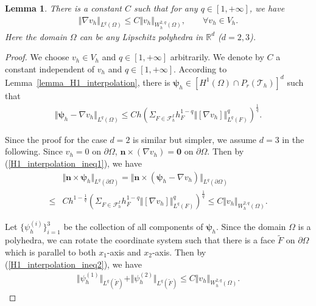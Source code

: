 \documentclass[12pt]{amsart}
\newtheorem{lemma}{Lemma}[section]
\theoremstyle{definition}
\theoremstyle{remark}
\begin{document}
\begin{lemma}
\label{lemma_discrete_norm_control}
There is a constant $C$ such that for any $q\in [1,+\infty]$, we have 
\begin{align*}
\Vert \nabla v_{h} \Vert_{L^{q}(\Omega)} \leq C \Vert v_{h}\Vert_{W_{h}^{2,q}(\Omega)}, 
\qquad \forall v_{h} \in V_{h}.
\end{align*}
Here the domain $\Omega$ can be any Lipschitz polyhedra in $\mathbb{R}^{d}$ ($d=2,3$).
\end{lemma}

\begin{proof}
We choose $v_{h}\in V_{h}$ and $q\in [1,+\infty]$ arbitrarily. We denote by $C$ a constant independent 
of $v_{h}$ and $q \in [1,+\infty]$. According to Lemma~\ref{lemma_H1_interpolation}, there is 
$\boldsymbol{\psi}_{h}\in [H^{1}(\Omega)\cap P_{r}(\mathcal{T}_{h})]^{d}$ such that 
\begin{align}
\label{H1_interpolation_ineq1}
\Vert \boldsymbol{\psi}_{h} - \nabla v_{h} \Vert_{L^{q}(\Omega)} 
\leq C h \left( \Sigma_{F \in \mathcal{F}_{h}^{I}} h_{F}^{1-q}\Vert [ \nabla v_{h}] 
\Vert_{L^{q}(F)}^{q} \right)^{\frac{1}{q}}.
\end{align}  

Since the proof for the case $d=2$ is similar but simpler, we assume $d=3$ in the following. 
Since $v_{h} = 0$ on $\partial\Omega$, $\boldsymbol{n}\times (\nabla v_{h}) = \boldsymbol{0}$ on $\partial\Omega$. 
Then by (\ref{H1_interpolation_ineq1}), we have 
\begin{align}
\label{H1_interpolation_ineq2}
& \Vert \boldsymbol{n} \times \boldsymbol{\psi}_{h} \Vert_{L^{q}(\partial\Omega)} 
= \Vert \boldsymbol{n} \times (\boldsymbol{\psi}_{h}-\nabla v_{h} )\Vert_{L^{q}(\partial\Omega)} \\
\nonumber
\leq & C h^{1-\frac{1}{q}}\left( \Sigma_{F \in \mathcal{F}_{h}^{I}} h_{F}^{1-q}\Vert [ \nabla v_{h}] 
\Vert_{L^{q}(F)}^{q} \right)^{\frac{1}{q}} \leq C \Vert v_{h}\Vert_{W_{h}^{2,q}(\Omega)}.
\end{align}

Let $\{ \psi_{h}^{(i)} \}_{i=1}^{3}$ be the collection of all components of $\boldsymbol{\psi}_{h}$.
Since the domain $\Omega$ is a polyhedra, we can rotate the coordinate system such that there is a face 
$\tilde{F}$ on $\partial\Omega$ which is parallel to both $x_{1}$-axis and $x_{2}$-axis. 
Then by (\ref{H1_interpolation_ineq2}), we have 
\begin{align}
\label{H1_interpolation_ineq3}
\Vert \psi_{h}^{(1)} \Vert_{L^{q}(\tilde{F})} + \Vert \psi_{h}^{(2)} \Vert_{L^{q}(\tilde{F})} 
\leq C \Vert v_{h}\Vert_{W_{h}^{2,q}(\Omega)}.
\end{align}


\end{proof}
\end{document}
